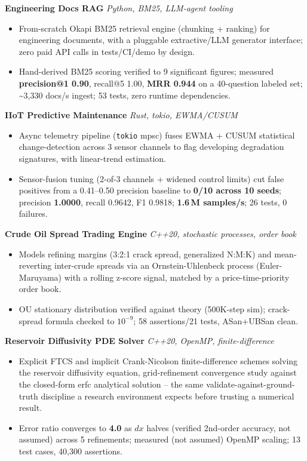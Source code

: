 \documentclass[10pt]{article}
\newcommand{\projectentry}[2]{%
  \noindent\textbf{#1} \hfill \textit{#2}\\[-0.3em]
}
\begin{document}
\projectentry{Engineering Docs RAG}{Python, BM25, LLM-agent tooling}
\begin{itemize}
  \item From-scratch Okapi BM25 retrieval engine (chunking + ranking) for engineering documents, with a pluggable extractive/LLM generator interface; zero paid API calls in tests/CI/demo by design.
  \item Hand-derived BM25 scoring verified to 9 significant figures; measured \textbf{precision@1 0.90}, recall@5 1.00, \textbf{MRR 0.944} on a 40-question labeled set; \textasciitilde3{,}330 docs/s ingest; 53 tests, zero runtime dependencies.
\end{itemize}

\projectentry{IIoT Predictive Maintenance}{Rust, tokio, EWMA/CUSUM}
\begin{itemize}
  \item Async telemetry pipeline (\texttt{tokio} mpsc) fuses EWMA + CUSUM statistical change-detection across 3 sensor channels to flag developing degradation signatures, with linear-trend estimation.
  \item Sensor-fusion tuning (2-of-3 channels + widened control limits) cut false positives from a 0.41--0.50 precision baseline to \textbf{0/10 across 10 seeds}; precision \textbf{1.0000}, recall 0.9642, F1 0.9818; \textbf{1.6\,M samples/s}; 26 tests, 0 failures.
\end{itemize}

\projectentry{Crude Oil Spread Trading Engine}{C++20, stochastic processes, order book}
\begin{itemize}
  \item Models refining margins (3:2:1 crack spread, generalized N:M:K) and mean-reverting inter-crude spreads via an Ornstein-Uhlenbeck process (Euler-Maruyama) with a rolling z-score signal, matched by a price-time-priority order book.
  \item OU stationary distribution verified against theory (500K-step sim); crack-spread formula checked to $10^{-9}$; 58 assertions/21 tests, ASan+UBSan clean.
\end{itemize}

\projectentry{Reservoir Diffusivity PDE Solver}{C++20, OpenMP, finite-difference}
\begin{itemize}
  \item Explicit FTCS and implicit Crank-Nicolson finite-difference schemes solving the reservoir diffusivity equation, grid-refinement convergence study against the closed-form erfc analytical solution -- the same validate-against-ground-truth discipline a research environment expects before trusting a numerical result.
  \item Error ratio converges to \textbf{4.0} as $dx$ halves (verified 2nd-order accuracy, not assumed) across 5 refinements; measured (not assumed) OpenMP scaling; 13 test cases, 40{,}300 assertions.
\end{itemize}
\end{document}
